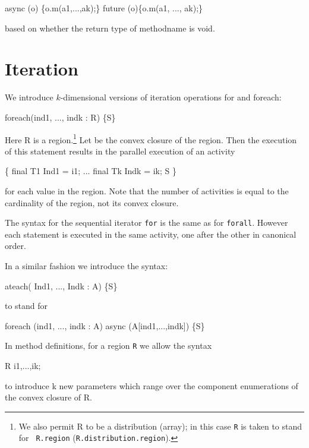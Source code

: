 \begin{x10}
 async (o) \{o.m(a1,...,ak);\}
 future (o)\{o.m(a1, ..., ak);\}
\end{x10}
\noindent based on whether the return type of methodname is {\cf void}.

\section{Iteration}\label{ForLoop}
\label{ForAllLoop}

We introduce  $k$-dimensional versions of iteration operations {\cf for} and 
{\cf foreach}:

\begin{x10}
   foreach(ind1, ..., indk : R) \{S\}
\end{x10}

Here {\cf R} is a region.\footnote{We also permit {\cf R} to be a
distribution (array); in this case {\tt R} is taken to stand for {\tt
R.region} ({\tt R.distribution.region}).}  Let {\cf [T1,..., Tk]} be
the convex closure of the region.  Then the execution of this
statement results in the parallel execution of an activity

\begin{x10}
   \{ final T1 Ind1 = i1; 
     ...
     final Tk Indk = ik;
     S
   \}
\end{x10}
\noindent for each value {\cf [i1,\ldots, ik]} in the region. Note that
the number of activities is equal to the cardinality of the region,
not its convex closure. 

The syntax for the sequential iterator {\tt for} is the same as for
{\tt forall}. However each statement is executed in the same activity,
one after the other in canonical order.

In a similar fashion we introduce the syntax:

\begin{x10}
   ateach( Ind1, ..., Indk : A) \{S\}
\end{x10}

\noindent to stand for
\begin{x10}
   foreach (ind1, ..., indk : A) 
    async (A[ind1,...,indk]) \{S\}
\end{x10}

In method definitions, for a region {\tt R} we allow the syntax 
\begin{x10}
     R i1,...,ik; 
\end{x10} 

\noindent to introduce {\cf k} new parameters which range over the
component enumerations of the convex closure of {\cf R}.

 \par  %



